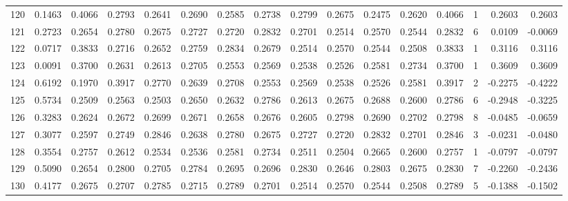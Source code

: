 \begin{tabular}{lrrrrrrrrrrrrrrr}
120 &      0.1463 &  0.4066 &  0.2793 &  0.2641 &  0.2690 &  0.2585 &  0.2738 &  0.2799 &  0.2675 &  0.2475 &   0.2620 &     0.4066 &      1 &                    0.2603 &                     0.2603 \\
121 &      0.2723 &  0.2654 &  0.2780 &  0.2675 &  0.2727 &  0.2720 &  0.2832 &  0.2701 &  0.2514 &  0.2570 &   0.2544 &     0.2832 &      6 &                    0.0109 &                    -0.0069 \\
122 &      0.0717 &  0.3833 &  0.2716 &  0.2652 &  0.2759 &  0.2834 &  0.2679 &  0.2514 &  0.2570 &  0.2544 &   0.2508 &     0.3833 &      1 &                    0.3116 &                     0.3116 \\
123 &      0.0091 &  0.3700 &  0.2631 &  0.2613 &  0.2705 &  0.2553 &  0.2569 &  0.2538 &  0.2526 &  0.2581 &   0.2734 &     0.3700 &      1 &                    0.3609 &                     0.3609 \\
124 &      0.6192 &  0.1970 &  0.3917 &  0.2770 &  0.2639 &  0.2708 &  0.2553 &  0.2569 &  0.2538 &  0.2526 &   0.2581 &     0.3917 &      2 &                   -0.2275 &                    -0.4222 \\
125 &      0.5734 &  0.2509 &  0.2563 &  0.2503 &  0.2650 &  0.2632 &  0.2786 &  0.2613 &  0.2675 &  0.2688 &   0.2600 &     0.2786 &      6 &                   -0.2948 &                    -0.3225 \\
126 &      0.3283 &  0.2624 &  0.2672 &  0.2699 &  0.2671 &  0.2658 &  0.2676 &  0.2605 &  0.2798 &  0.2690 &   0.2702 &     0.2798 &      8 &                   -0.0485 &                    -0.0659 \\
127 &      0.3077 &  0.2597 &  0.2749 &  0.2846 &  0.2638 &  0.2780 &  0.2675 &  0.2727 &  0.2720 &  0.2832 &   0.2701 &     0.2846 &      3 &                   -0.0231 &                    -0.0480 \\
128 &      0.3554 &  0.2757 &  0.2612 &  0.2534 &  0.2536 &  0.2581 &  0.2734 &  0.2511 &  0.2504 &  0.2665 &   0.2600 &     0.2757 &      1 &                   -0.0797 &                    -0.0797 \\
129 &      0.5090 &  0.2654 &  0.2800 &  0.2705 &  0.2784 &  0.2695 &  0.2696 &  0.2830 &  0.2646 &  0.2803 &   0.2675 &     0.2830 &      7 &                   -0.2260 &                    -0.2436 \\
130 &      0.4177 &  0.2675 &  0.2707 &  0.2785 &  0.2715 &  0.2789 &  0.2701 &  0.2514 &  0.2570 &  0.2544 &   0.2508 &     0.2789 &      5 &                   -0.1388 &                    -0.1502 \\

\end{tabular}
